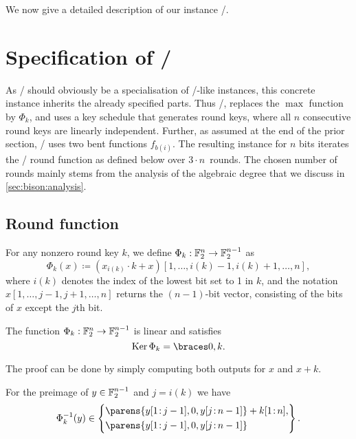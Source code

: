 We now give a detailed description of our instance \bison/.

\section{Specification of \bison/}\label{sec:bison:instance}
As \bison/ should obviously be a specialisation of \bison/-like instances, this concrete instance inherits the already specified parts.
Thus \bison/, replaces the $\max$ function by $\Phi_k$, and uses a key schedule that generates round keys, where all $n$ consecutive round keys are linearly independent.
Further, as assumed at the end of the prior section, \bison/ uses two bent functions $f_{b(i)}$.
The resulting instance for $n$ bits iterates the \WSN/ round function as defined below over $3 \cdot n$~rounds.
The chosen number of rounds mainly stems from the analysis of the algebraic degree that we discuss in \cref{sec:bison:analysis}.

\subsection{Round function}
For any nonzero round key $k$, we define $\Phi_{k} : \mathbb{F}_2^{n} \to \mathbb{F}_2^{n-1}$ as
\begin{equation}\label{bison:eqn:phi}
    \Phi_{k}(x) \coloneqq (x_{i(k)} \cdot k + x)[1,\ldots,i(k)-1,i(k)+1,\ldots,n],
\end{equation}
where $i(k)$ denotes the index of the lowest bit set to 1 in $k$, and the notation $x[1,\ldots,j-1,j+1,\ldots,n]$ returns the $(n-1)$-bit vector, consisting of the bits of $x$ except the $j$th bit.

\begin{lemma}\label{bison:lem:phi_prop}
    The function $\Phi_k : \mathbb{F}_2^{n} \to \mathbb{F}_2^{n-1}$ is linear and satisfies
    \begin{equation*}
        \Ker \Phi_{k} = \set{0,k}.
    \end{equation*}
\end{lemma}
The proof can be done by simply computing both outputs for $x$ and $x+k$.

For the preimage of $y \in \mathbb{F}_2^{n-1}$ and $j = i(k)$ we have
\begin{equation}\label{bison:eqn:phi_preimage}
    \Phi_k^{-1}(y) \in \left\{
        \begin{aligned}
            &\parens{y[1\colon\!j-1], 0, y[j\colon\!n-1]} + k[1\colon\!n], \\
            &\parens{y[1\colon\!j-1], 0, y[j\colon\!n-1]}
        \end{aligned}
    \right\}.
\end{equation}

